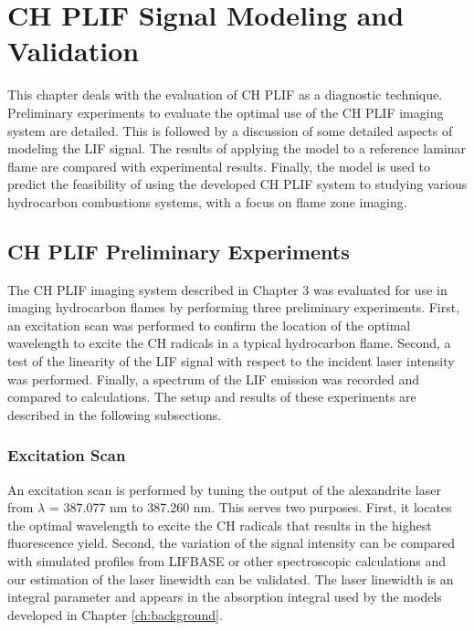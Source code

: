 \chapter{CH PLIF Signal Modeling and Validation}
\label{ch:chplif}

This chapter deals with the evaluation of CH PLIF as a diagnostic technique.
Preliminary experiments to evaluate the optimal use of the CH PLIF imaging system are detailed.
This is followed by a discussion of some detailed aspects of modeling the LIF signal.
The results of applying the model to a reference laminar flame are compared with experimental results.
Finally, the model is used to predict the feasibility of using the developed CH PLIF system to studying various hydrocarbon combustions systems, with a focus on flame zone imaging.

\section{CH PLIF Preliminary Experiments}
\label{sec:chplif-preliminary-experiments}

The CH PLIF imaging system described in Chapter 3 was evaluated for use in imaging hydrocarbon flames by performing three preliminary experiments.
First, an excitation scan was performed to confirm the location of the optimal wavelength to excite the CH radicals in a typical hydrocarbon flame.
Second, a test of the linearity of the LIF signal with respect to the incident laser intensity was performed.
Finally, a spectrum of the LIF emission was recorded and compared to calculations.
The setup and results of these experiments are described in the following subsections.

\subsection{Excitation Scan}
\label{subsec:prelim-excitation-scan}

An excitation scan is performed by tuning the output of the alexandrite laser from \(\lambda\) = 387.077 nm to 387.260 nm.
This serves two purposes.
First, it locates the optimal wavelength to excite the CH radicals that results in the highest fluorescence yield.
Second, the variation of the signal intensity can be compared with simulated profiles from LIFBASE or other spectroscopic calculations and our estimation of the laser linewidth can be validated.
The laser linewidth is an integral parameter and appears in the absorption integral used by the models developed in Chapter \ref{ch:background}.


